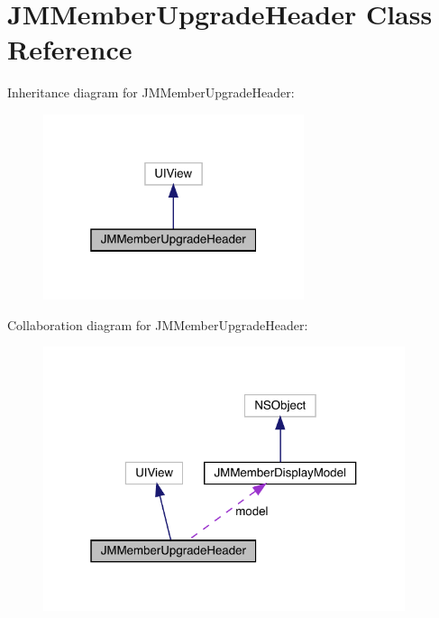 \hypertarget{interface_j_m_member_upgrade_header}{}\section{J\+M\+Member\+Upgrade\+Header Class Reference}
\label{interface_j_m_member_upgrade_header}


Inheritance diagram for J\+M\+Member\+Upgrade\+Header\+:\nopagebreak
\begin{figure}[H]
\begin{center}
\leavevmode
\includegraphics[width=217pt]{interface_j_m_member_upgrade_header__inherit__graph}
\end{center}
\end{figure}


Collaboration diagram for J\+M\+Member\+Upgrade\+Header\+:\nopagebreak
\begin{figure}[H]
\begin{center}
\leavevmode
\includegraphics[width=301pt]{interface_j_m_member_upgrade_header__coll__graph}
\end{center}
\end{figure}
